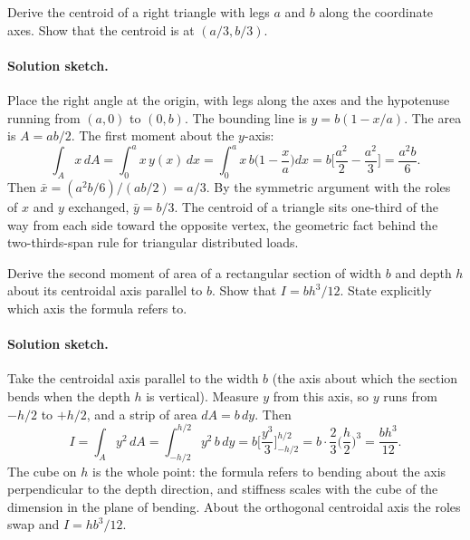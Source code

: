\begin{exercise}
Derive the centroid of a right triangle with legs $a$ and $b$ along
the coordinate axes. Show that the centroid is at $(a/3, b/3)$.

\paragraph{Solution sketch.} Place the right angle at the origin, with
legs along the axes and the hypotenuse running from $(a, 0)$ to
$(0, b)$. The bounding line is $y = b(1 - x/a)$. The area is $A = ab/2$.
The first moment about the $y$-axis:
\[
\int_A x\, dA = \int_0^a x \, y(x)\, dx
= \int_0^a x\, b\Big(1 - \frac{x}{a}\Big) dx
= b\Big[\frac{a^2}{2} - \frac{a^2}{3}\Big] = \frac{a^2 b}{6}.
\]
Then $\bar{x} = (a^2 b / 6)/(ab/2) = a/3$. By the symmetric argument
with the roles of $x$ and $y$ exchanged, $\bar{y} = b/3$. The centroid
of a triangle sits one-third of the way from each side toward the
opposite vertex, the geometric fact behind the two-thirds-span rule for
triangular distributed loads.
\end{exercise}

\begin{exercise}
Derive the second moment of area of a rectangular section of width
$b$ and depth $h$ about its centroidal axis parallel to $b$. Show
that $I = bh^3 / 12$. State explicitly which axis the formula
refers to.

\paragraph{Solution sketch.} Take the centroidal axis parallel to the
width $b$ (the axis about which the section bends when the depth $h$ is
vertical). Measure $y$ from this axis, so $y$ runs from $-h/2$ to
$+h/2$, and a strip of area $dA = b\, dy$. Then
\[
I = \int_A y^2\, dA = \int_{-h/2}^{h/2} y^2\, b\, dy
= b\Big[\frac{y^3}{3}\Big]_{-h/2}^{h/2}
= b\cdot \frac{2}{3}\Big(\frac{h}{2}\Big)^3 = \frac{b h^3}{12}.
\]
The cube on $h$ is the whole point: the formula refers to bending about
the axis perpendicular to the depth direction, and stiffness scales with
the cube of the dimension in the plane of bending. About the orthogonal
centroidal axis the roles swap and $I = h b^3 / 12$.
\end{exercise}

